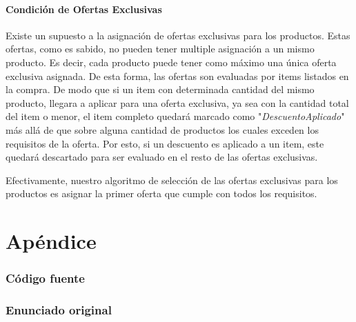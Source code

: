 \documentclass[a4paper,11pt]{article}
\begin{document}
\subsection{Condición de Ofertas Exclusivas}
Existe un supuesto a la asignación de ofertas exclusivas para los productos. 
Estas ofertas, como es sabido, no pueden tener multiple asignación a un mismo producto. 
Es decir, cada producto puede tener como máximo una única oferta exclusiva asignada. 
De esta forma, las ofertas son evaluadas por items listados en la compra. De modo que si un item 
con determinada cantidad del mismo producto, llegara a aplicar para una oferta exclusiva, 
ya sea con la cantidad total del item o menor, el item completo quedará marcado como 
"\textit{DescuentoAplicado}" más allá de que sobre alguna cantidad de productos los cuales exceden
los requisitos de la oferta.
Por esto, si un descuento es aplicado a un item, este quedará descartado para ser evaluado 
en el resto de las ofertas exclusivas.

Efectivamente, nuestro algoritmo de selección de las ofertas exclusivas para los productos 
es asignar la primer oferta que cumple con todos los requisitos.

\clearpage

\part{Apéndice}
\appendix

\section{Código fuente}

\FloatBarrier
\clearpage

\section{Enunciado original}\label{sec:enunciado}

\end{document}
